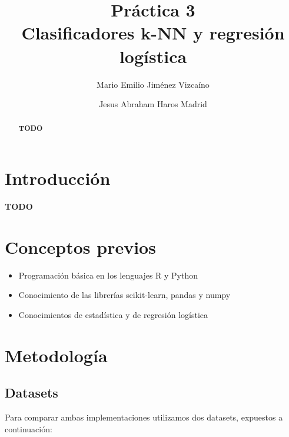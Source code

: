 \documentclass[sigconf,authorversion,nonacm]{acmart}
\begin{document}
\title{Práctica 3 \\ Clasificadores k-NN y regresión logística}

\author{Mario Emilio Jiménez Vizcaíno}

\author{Jesus Abraham Haros Madrid}


\begin{abstract}
\textbf{TODO}
\end{abstract}

\maketitle

\section{Introducción}
\textbf{TODO}

\section{Conceptos previos}
\begin{itemize}
  \item Programación básica en los lenguajes R y Python
  \item Conocimiento de las librerías scikit-learn, pandas y numpy
  \item Conocimientos de estadística y de regresión logística
\end{itemize}


\section{Metodología}

\subsection{Datasets}
Para comparar ambas implementaciones utilizamos dos datasets, expuestos a continuación:
\end{document}
